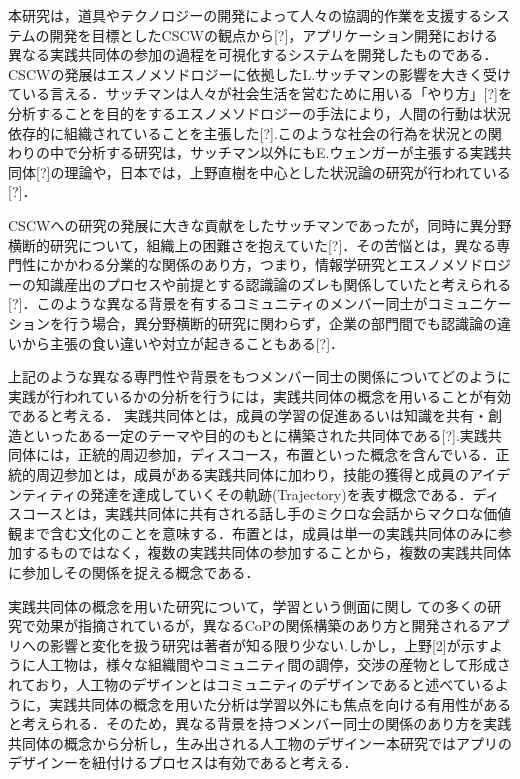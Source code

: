 \documentclass[submit,techrep]{ipsj}
\begin{document}
本研究は，道具やテクノロジーの開発によって人々の協調的作業を支援するシステムの開発を目標としたCSCWの観点から[?]，アプリケーション開発における異なる実践共同体の参加の過程を可視化するシステムを開発したものである．CSCWの発展はエスノメソドロジーに依拠したL.サッチマンの影響を大きく受けている言える．サッチマンは人々が社会生活を営むために用いる「やり方」[?]を分析することを目的をするエスノメソドロジーの手法により，人間の行動は状況依存的に組織されていることを主張した[?].このような社会の行為を状況との関わりの中で分析する研究は，サッチマン以外にもE.ウェンガーが主張する実践共同体[?]の理論や，日本では，上野直樹を中心とした状況論の研究が行われている[?]．

CSCWへの研究の発展に大きな貢献をしたサッチマンであったが，同時に異分野横断的研究について，組織上の困難さを抱えていた[?]．その苦悩とは，異なる専門性にかかわる分業的な関係のあり方，つまり，情報学研究とエスノメソドロジーの知識産出のプロセスや前提とする認識論のズレも関係していたと考えられる[?]．このような異なる背景を有するコミュニティのメンバー同士がコミュニケーションを行う場合，異分野横断的研究に関わらず，企業の部門間でも認識論の違いから主張の食い違いや対立が起きることもある[?]．

上記のような異なる専門性や背景をもつメンバー同士の関係についてどのように実践が行われているかの分析を行うには，実践共同体の概念を用いることが有効であると考える．
実践共同体とは，成員の学習の促進あるいは知識を共有・創造といったある一定のテーマや目的のもとに構築された共同体である[?].実践共同体には，正統的周辺参加，ディスコース，布置といった概念を含んでいる．正統的周辺参加とは，成員がある実践共同体に加わり，技能の獲得と成員のアイデンティティの発達を達成していくその軌跡(Trajectory)を表す概念である．ディスコースとは，実践共同体に共有される話し手のミクロな会話からマクロな価値観まで含む文化のことを意味する．布置とは，成員は単一の実践共同体のみに参加するものではなく，複数の実践共同体の参加することから，複数の実践共同体に参加しその関係を捉える概念である．

実践共同体の概念を用いた研究について，学習という側面に関し ての多くの研究で効果が指摘されているが，異なるCoPの関係構築のあり方と開発されるアプリへの影響と変化を扱う研究は著者が知る限り少ない.しかし，上野[2]が示すように人工物は，様々な組織間やコミュニティ間の調停，交渉の産物として形成されており，人工物のデザインとはコミュニティのデザインであると述べているように，実践共同体の概念を用いた分析は学習以外にも焦点を向ける有用性があると考えられる．そのため，異なる背景を持つメンバー同士の関係のあり方を実践共同体の概念から分析し，生み出される人工物のデザインー本研究ではアプリのデザインーを紐付けるプロセスは有効であると考える．
\end{document}
